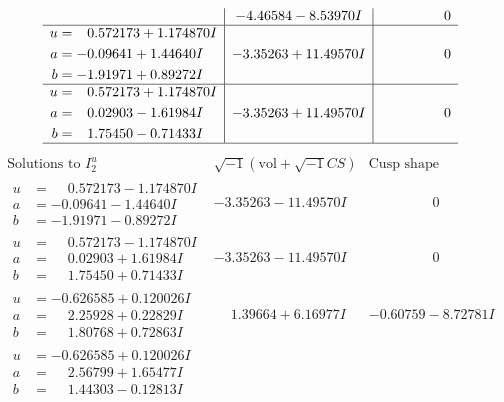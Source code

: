 \documentclass[1p]{elsarticle_modified}
\theoremstyle{definition}
\newcommand{\I}{\sqrt{-1}}
\begin{document}
$$\begin{array}{c|c|c}
 & -4.46584 - 8.53970 I & \phantom{-0.000000 } 0 \\ \hline\begin{aligned}
u &= \phantom{-}0.572173 + 1.174870 I \\
a &= -0.09641 + 1.44640 I \\
b &= -1.91971 + 0.89272 I\end{aligned}
 & -3.35263 + 11.49570 I & \phantom{-0.000000 } 0 \\ \hline\begin{aligned}
u &= \phantom{-}0.572173 + 1.174870 I \\
a &= \phantom{-}0.02903 - 1.61984 I \\
b &= \phantom{-}1.75450 - 0.71433 I\end{aligned}
 & -3.35263 + 11.49570 I & \phantom{-0.000000 } 0\\
 \hline 
 \end{array}$$\newpage$$\begin{array}{c|c|c}  
\text{Solutions to }I^u_{2}& \I (\text{vol} + \sqrt{-1}CS) & \text{Cusp shape}\\
 \hline 
\begin{aligned}
u &= \phantom{-}0.572173 - 1.174870 I \\
a &= -0.09641 - 1.44640 I \\
b &= -1.91971 - 0.89272 I\end{aligned}
 & -3.35263 - 11.49570 I & \phantom{-0.000000 } 0 \\ \hline\begin{aligned}
u &= \phantom{-}0.572173 - 1.174870 I \\
a &= \phantom{-}0.02903 + 1.61984 I \\
b &= \phantom{-}1.75450 + 0.71433 I\end{aligned}
 & -3.35263 - 11.49570 I & \phantom{-0.000000 } 0 \\ \hline\begin{aligned}
u &= -0.626585 + 0.120026 I \\
a &= \phantom{-}2.25928 + 0.22829 I \\
b &= \phantom{-}1.80768 + 0.72863 I\end{aligned}
 & \phantom{-}1.39664 + 6.16977 I & -0.60759 - 8.72781 I \\ \hline\begin{aligned}
u &= -0.626585 + 0.120026 I \\
a &= \phantom{-}2.56799 + 1.65477 I \\
b &= \phantom{-}1.44303 - 0.12813 I\end{aligned}

\end{array}$$
\end{document}
